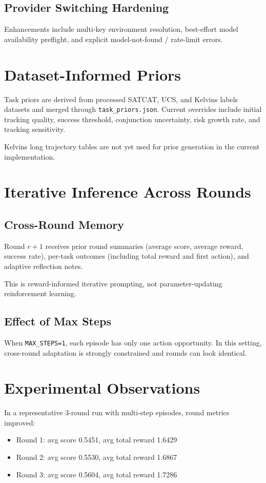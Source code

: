 \documentclass[conference]{IEEEtran}
\begin{document}
\subsection{Provider Switching Hardening}
Enhancements include multi-key environment resolution, best-effort model availability preflight, and explicit model-not-found / rate-limit errors.

\section{Dataset-Informed Priors}
Task priors are derived from processed SATCAT, UCS, and Kelvins labels datasets and merged through \texttt{task\_priors.json}. Current overrides include initial tracking quality, success threshold, conjunction uncertainty, risk growth rate, and tracking sensitivity.

Kelvins long trajectory tables are not yet used for prior generation in the current implementation.

\section{Iterative Inference Across Rounds}
\subsection{Cross-Round Memory}
Round $r+1$ receives prior round summaries (average score, average reward, success rate), per-task outcomes (including total reward and first action), and adaptive reflection notes.

This is reward-informed iterative prompting, not parameter-updating reinforcement learning.

\subsection{Effect of Max Steps}
When \texttt{MAX\_STEPS=1}, each episode has only one action opportunity. In this setting, cross-round adaptation is strongly constrained and rounds can look identical.

\section{Experimental Observations}
In a representative 3-round run with multi-step episodes, round metrics improved:

\begin{itemize}
\item Round 1: avg score 0.5451, avg total reward 1.6429
\item Round 2: avg score 0.5530, avg total reward 1.6867
\item Round 3: avg score 0.5604, avg total reward 1.7286
\end{itemize}
\end{document}
